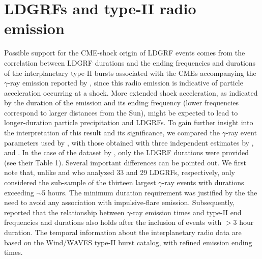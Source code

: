 \documentclass{aastex61}
\begin{document}
\section{LDGRFs and type-II radio emission}\label{Gamma-ray and type-II radio emission}
Possible support for the CME-shock origin of LDGRF events comes from the correlation between LDGRF durations and the ending frequencies and durations of the interplanetary type-II bursts associated with the CMEs accompanying the $\gamma$-ray emission reported by 
\citet{ref:GOPALSWAMY2018}, since this radio emission is indicative of particle acceleration occurring at a shock. More extended shock acceleration, as indicated by the duration of the emission and its ending frequency (lower frequencies correspond to larger distances from the Sun), might be expected to lead to longer-duration particle precipitation and LDGRFs. 
To gain further insight into the interpretation of this result and its significance, we compared the $\gamma$-ray event parameters used by \citet{ref:GOPALSWAMY2018}, with those obtained with three independent estimates by \citet{ref:SHARE2018}, \citet{ref:WINTER2018} and \citet{ref:AJELLO2021}. In the case of the dataset by \citet{ref:AJELLO2021}, only the LDGRF durations were provided (see their Table 1). Several important differences can be pointed out. We first note that, unlike \citet{ref:SHARE2018} and \citet{ref:WINTER2018} who analyzed 33 and 29 LDGRFs, respectively, \citet{ref:GOPALSWAMY2018} only considered the sub-sample of the thirteen largest $\gamma$-ray events with durations exceeding $\sim$5 hours. 
The minimum duration requirement was justified by the the need to avoid any association with impulsive-flare emission.
Subsequently,
\citet{ref:GOPALSWAMY2019b} reported that the relationship between $\gamma$-ray emission times and type-II end frequencies and durations also holds after the inclusion of events with $>$3 hour duration.
The temporal information about the interplanetary radio data are based on the Wind/WAVES type-II burst catalog, 
with refined emission ending times. 
\end{document}
